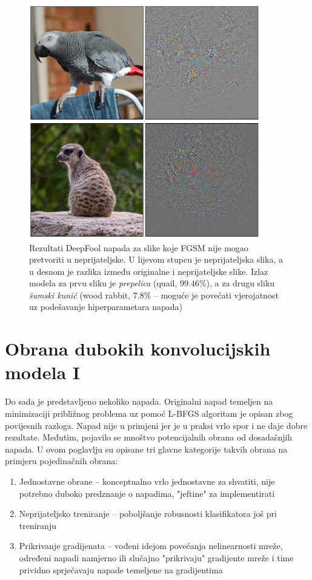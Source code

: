 \documentclass[utf8, diplomski]{fer}
\begin{document}
\begin{figure}[H]
\centering
\includegraphics[width=0.9\textwidth,keepaspectratio]{img/results/deepfool_hard.png}
\caption{Rezultati DeepFool napada za slike koje FGSM nije mogao pretvoriti u neprijateljske. U lijevom stupcu je neprijateljska slika, a u desnom je razlika između originalne i neprijateljske slike. Izlaz modela za prvu sliku je \textit{prepelica} (quail, $99.46\%$), a za drugu sliku \textit{šumski kunić} (wood rabbit, $7.8\%$ -- moguće je povećati vjerojatnost uz podešavanje hiperparametara napada)}
\end{figure}\label{deepfool_hard}


\chapter{Obrana dubokih konvolucijskih modela I}
Do sada je predstavljeno nekoliko napada. Originalni napad temeljen na minimizaciji približnog problema uz pomoć L-BFGS algoritam je opisan zbog povijesnih razloga. Napad nije u primjeni jer je u praksi vrlo spor i ne daje dobre rezultate. Međutim, pojavilo se mnoštvo potencijalnih obrana od dosadašnjih napada. U ovom poglavlju su opisane tri glavne kategorije takvih obrana na primjeru pojedinačnih obrana: 
\begin{enumerate}[noitemsep, label=\textbullet]
\item Jednostavne obrane -- konceptualno vrlo jednostavne za shvatiti, nije potrebno duboko predznanje o napadima, "jeftine" za implementirati
\item Neprijateljsko treniranje -- poboljšanje robusnosti klasifikatora još pri treniranju
\item Prikrivanje gradijenata -- vođeni idejom povećanja nelinearnosti mreže, određeni napadi namjerno ili slučajno "prikrivaju" gradijente mreže i time prividno sprječavaju napade temeljene na gradijentima
\end{enumerate}
\end{document}
